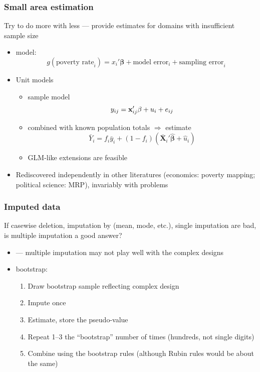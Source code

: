 \documentclass[handout]{beamer}
\begin{document}
\begin{frame}\frametitle{Small area estimation}

Try to do more with less --- provide estimates for domains with insufficient sample size

\begin{itemize}
    \item \citet{fay:herriot:1979} model:
        $$
            g(\mbox{poverty rate}_i) = x_i'\mathbf{\beta} + \mbox{model error}_i + \mbox{sampling error}_i
        $$
    \item Unit models \citep{rao:molina:2015}
    \begin{itemize}
        \item sample model
            $$
                y_{ij} = {\bf x}_{ij}' \mathbf{\beta} + u_i + e_{ij}
            $$
        \item combined with known population totals $\Rightarrow$ estimate
            $$
                \bar Y_i = f_i \bar y_i + (1-f_i) (\bar {\mathbf X}_i ' \hat{\mathbf{\beta}} + \hat u_i)
            $$
        \item GLM-like extensions are feasible
    \end{itemize}
    \item Rediscovered independently in other literatures (economics: poverty mapping; political science: MRP),
        invariably with problems \citep{molina:rao:2010}
\end{itemize}

\end{frame}

\begin{frame}\frametitle{Imputed data}

If casewise deletion, imputation by (mean, mode, etc.), single imputation
are bad, is multiple imputation \citep{rubin:1996} a good answer?

\begin{itemize}
    \item \citet{kim:brick:fuller:kalton:2006} --- multiple imputation may not play well with the complex designs
    \item \citet{shao:sitter:1996} bootstrap:
        \begin{enumerate}
            \item Draw bootstrap sample reflecting complex design
            \item Impute once
            \item Estimate, store the pseudo-value
            \item Repeat 1--3 the ``bootstrap'' number of times (hundreds, not single digits)
            \item Combine using the bootstrap rules (although Rubin rules would be about the same)
        \end{enumerate}
\end{itemize}

\end{frame}
\end{document}
